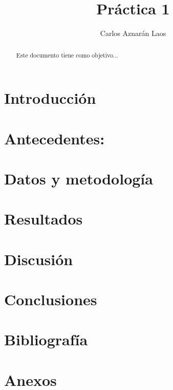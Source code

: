 \documentclass[12pt,a4paper]{article}
\author{Carlos Aznarán Laos}
\title{Práctica 1}
\begin{document}
\maketitle

\begin{abstract}
Este documento tiene como objetivo...
\end{abstract}

\section{Introducción}
\section{Antecedentes:}
\section{Datos y metodología}
\section{Resultados}
\section{Discusión}
\section{Conclusiones}
\section*{Bibliografía}
\section*{Anexos}
\end{document}
